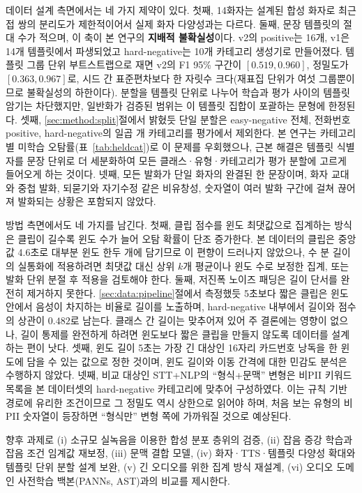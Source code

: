 \documentclass[11pt]{article}
\renewcommand{\emph}[1]{\textbf{#1}}
\begin{document}
데이터 설계 측면에서는 네 가지 제약이 있다. 첫째, 14화자는 설계된 합성 화자로 최근접 쌍의
분리도가 제한적이어서 실제 화자 다양성과는 다르다. 둘째, 문장 템플릿의 절대 수가 적으며, 이
축이 본 연구의 \emph{지배적 불확실성}이다. v2의 positive는 16개, v1은 14개 템플릿에서
파생되었고 hard-negative는 10개 카테고리 생성기로 만들어졌다. 템플릿 그룹 단위 부트스트랩으로
재면 v2의 F1 95\% 구간이 $[0.519, 0.960]$, 정밀도가 $[0.363, 0.967]$로, 시드 간
표준편차보다 한 자릿수 크다(재표집 단위가 여섯 그룹뿐이므로 불확실성의 하한이다). 분할을 템플릿 단위로 나누어 학습과 평가 사이의 템플릿 암기는
차단했지만, 일반화가 검증된 범위는 이 템플릿 집합이 포괄하는 문형에 한정된다. 셋째,
\ref{sec:method:split}절에서 밝혔듯 단일 분할은 easy-negative 전체, 전화번호 positive,
hard-negative의 일곱 개 카테고리를 평가에서 제외한다. 본 연구는 카테고리별 미학습
오탐률(표~\ref{tab:heldcat})로 이 문제를 우회했으나, 근본 해결은 템플릿 식별자를 문장 단위로
더 세분화하여 모든 클래스·유형·카테고리가 평가 분할에 고르게 들어오게 하는 것이다. 넷째,
모든 발화가 단일 화자의 완결된 한 문장이며, 화자 교대와 중첩 발화, 되묻기와 자기수정 같은
비유창성, 숫자열이 여러 발화 구간에 걸쳐 끊어져 발화되는 상황은 포함되지 않았다.

방법 측면에서도 네 가지를 남긴다. 첫째, 클립 점수를 윈도 최댓값으로 집계하는 방식은 클립이
길수록 윈도 수가 늘어 오탐 확률이 단조 증가한다. 본 데이터의 클립은 중앙값 4.6초로 대부분
윈도 한두 개에 담기므로 이 편향이 드러나지 않았으나, 수 분 길이의 실통화에 적용하려면
최댓값 대신 상위 $k$개 평균이나 윈도 수로 보정한 집계, 또는 발화 단위 분절 후 적용을
검토해야 한다. 둘째, 저진폭 노이즈 패딩은 길이 단서를 완전히 제거하지 못한다.
\ref{sec:data:pipeline}절에서 측정했듯 5초보다 짧은 클립은 윈도 안에서 음성이 차지하는 비율로
길이를 노출하며, hard-negative 내부에서 길이와 점수의 상관이 $0.482$로 남는다. 클래스 간
길이는 맞추어져 있어 주 결론에는 영향이 없으나, 길이 통제를 완전하게 하려면 윈도보다 짧은
클립을 만들지 않도록 데이터를 설계하는 편이 낫다. 셋째, 윈도 길이 5초는 가장 긴 대상인
16자리 카드번호 낭독을 한 윈도에 담을 수 있는 값으로 정한 것이며, 윈도 길이와 이동 간격에
대한 민감도 분석은 수행하지 않았다. 넷째, 비교 대상인 STT+NLP의 ``형식+문맥'' 변형은 비PII
키워드 목록을 본 데이터셋의 hard-negative 카테고리에 맞추어 구성하였다. 이는 규칙 기반 경로에
유리한 조건이므로 그 정밀도 역시 상한으로 읽어야 하며, 처음 보는 유형의 비PII 숫자열이
등장하면 ``형식만'' 변형 쪽에 가까워질 것으로 예상된다.

향후 과제로 (i) 소규모 실녹음을 이용한 합성 분포 층위의 검증, (ii) 잡음 증강 학습과 잡음
조건 임계값 재보정, (iii) 문맥 결합 모델, (iv) 화자·TTS·템플릿 다양성 확대와 템플릿 단위
분할 설계 보완, (v) 긴 오디오를 위한 집계 방식 재설계, (vi) 오디오 도메인 사전학습
백본(PANNs, AST)과의 비교를 제시한다.
\end{document}
